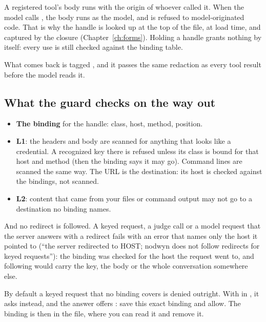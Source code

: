 \begin{careful}
A registered tool's body runs with the origin of whoever called it. When
the model calls , the body runs as the model, and
 is refused to model-originated code. That is why
the handle is looked up at the top of the file, at load time, and captured
by the closure (Chapter~\ref{ch:forms}). Holding a handle grants nothing by
itself: every use is still checked against the binding table.
\end{careful}

What comes back is tagged , and it passes the same
redaction as every tool result before the model reads it.

\subsection{What the guard checks on the way out}

\begin{itemize}
  \item \textbf{The binding} for the handle: class, host, method, position.
  \item \textbf{L1}: the headers and body are scanned for anything that
    looks like a credential. A recognized key there is refused unless its
    class is bound for that host and method (then the binding says it may
    go). Command lines are scanned the same way. The URL is the
    destination: its host is checked against the bindings, not scanned.
  \item \textbf{L2}: content that came from your files or command output may
    not go to a destination no binding names.
\end{itemize}

And no redirect is followed. A keyed request, a judge call or a model
request that the server answers with a redirect fails with an error that
names only the host it pointed to (``the server redirected to HOST; nodwyn
does not follow redirects for keyed requests''): the binding was checked
for the host the request went to, and following would carry the key, the
body or the whole conversation somewhere else.

By default a keyed request that no binding covers is denied outright. With
 in , it asks instead,
and the answer offers : save this exact binding and allow. The binding is then in the
file, where you can read it and remove it.

